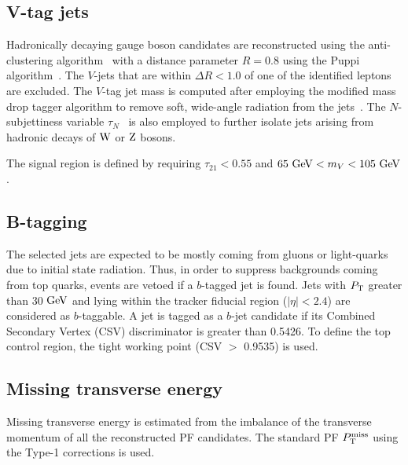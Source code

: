 \subsection{V-tag jets}
Hadronically decaying gauge boson candidates are reconstructed using the anti-\kt clustering algorithm~\cite{antikt} with a distance parameter $R=0.8$ using the Puppi algorithm~\cite{Bertolini:2014bba}. The $V$-jets that are within $\Delta R < 1.0$ of one of the identified leptons are excluded. The $V$-tag jet mass is computed after employing the modified mass drop tagger algorithm to remove soft, wide-angle radiation from the jets~\cite{Dasgupta:2013ihk,Larkoski:2014wba}. The $N$-subjettiness variable $\tau_N$~\cite{Thaler:2010tr} is also employed to further isolate jets arising from hadronic decays of $\mathrm{W}$ or $\mathrm{Z}$ bosons.   

The signal region is defined by requiring $\tau_{21}<0.55$ and $ 65 ~\mathrm{GeV} < m_{V} < 105 ~\mathrm{GeV}$.

\subsection{B-tagging}

The selected jets are expected to be mostly coming from gluons or light-quarks
due to initial state radiation. Thus, in order to suppress backgrounds coming from top quarks, events are vetoed if a $b$-tagged jet is found.
Jets with $P_\mathrm{T}$ greater than 30 $\mathrm{GeV}$ and lying within the tracker fiducial region ($\left|\eta\right|<2.4$) are considered as $b$-taggable.
A jet is tagged as a $b$-jet candidate if its Combined Secondary Vertex (CSV) discriminator is greater than 0.5426. To define the top control region, the tight working point (CSV $>$ 0.9535) is used.


\subsection{Missing transverse energy}
Missing transverse energy is estimated from the imbalance of the transverse momentum of all the reconstructed PF candidates. The standard PF $P_\mathrm{T}^{\mathrm{miss}}$ using the Type-1 corrections is used. 

